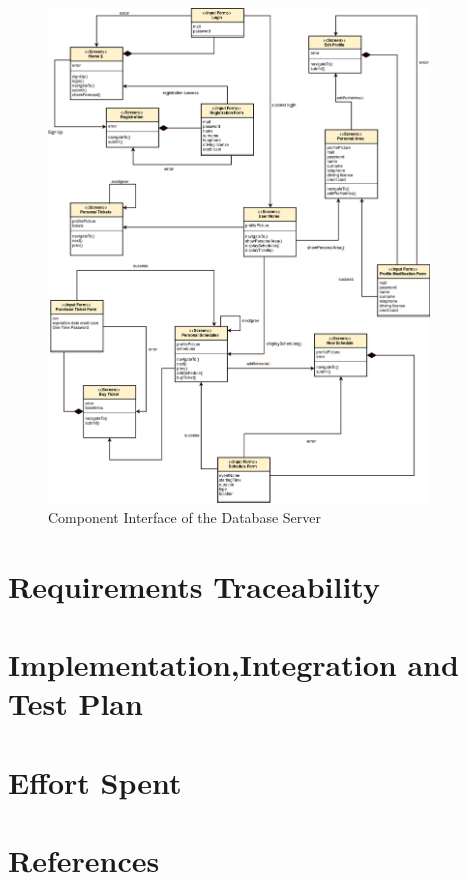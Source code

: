 \documentclass[numbers=noenddot, 12pt, a4paper, oneside]{scrbook}
\begin{document}
\begin{figure}[H]
	\centering
	\includegraphics[width=0.9\textwidth]{images/UXDiagram2}
	\caption{Component Interface of the Database Server}
\end{figure}

\chapter{Requirements Traceability}

\chapter{Implementation,Integration and Test Plan}


\chapter{Effort Spent}


\chapter{References}
\end{document}
